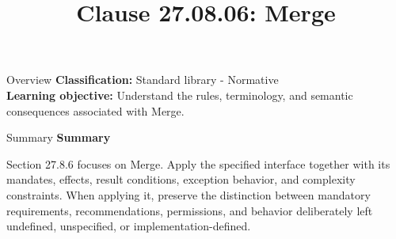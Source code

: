 \documentclass[10pt,letterpaper]{article}
\title{Clause 27.08.06: Merge}
\author{}
\date{}
\begin{document}
\maketitle
\begin{CornellOverviewBox}{Overview}
\textbf{Classification:} Standard library - Normative\\[2pt]
\textbf{Learning objective:} Understand the rules, terminology, and semantic consequences associated with Merge.
\end{CornellOverviewBox}\begin{CornellSummaryBox}{Summary}
{\sffamily\bfseries\color{Accent} Summary}\par\vspace{3pt}Section 27.8.6 focuses on Merge. Apply the specified interface together with its mandates, effects, result conditions, exception behavior, and complexity constraints. When applying it, preserve the distinction between mandatory requirements, recommendations, permissions, and behavior deliberately left undefined, unspecified, or implementation-defined.
\end{CornellSummaryBox}
\end{document}
